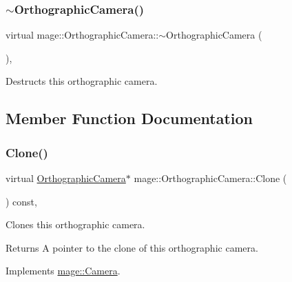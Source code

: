 \subsubsection{\texorpdfstring{$\sim$\+Orthographic\+Camera()}{~OrthographicCamera()}}
{\footnotesize\ttfamily virtual mage\+::\+Orthographic\+Camera\+::$\sim$\+Orthographic\+Camera (\begin{DoxyParamCaption}{ }\end{DoxyParamCaption})\hspace{0.3cm}{\ttfamily [virtual]}, {\ttfamily [default]}}

Destructs this orthographic camera. 

\subsection{Member Function Documentation}
\hypertarget{classmage_1_1_orthographic_camera_ae075c08e4af88f74212bf5c84d2e5b2a}{}\label{classmage_1_1_orthographic_camera_ae075c08e4af88f74212bf5c84d2e5b2a} 
\subsubsection{\texorpdfstring{Clone()}{Clone()}}
{\footnotesize\ttfamily virtual \hyperlink{classmage_1_1_orthographic_camera}{Orthographic\+Camera}$\ast$ mage\+::\+Orthographic\+Camera\+::\+Clone (\begin{DoxyParamCaption}{ }\end{DoxyParamCaption}) const\hspace{0.3cm}{\ttfamily [override]}, {\ttfamily [virtual]}}

Clones this orthographic camera.

\begin{DoxyReturn}{Returns}
A pointer to the clone of this orthographic camera. 
\end{DoxyReturn}


Implements \hyperlink{classmage_1_1_camera_a19301c2256c183db50b5e9406f7b5f3c}{mage\+::\+Camera}.

\hypertarget{classmage_1_1_orthographic_camera_aedd86e56a0f7bc967ad8d9be2631a0cf}{}\label{classmage_1_1_orthographic_camera_aedd86e56a0f7bc967ad8d9be2631a0cf} 
